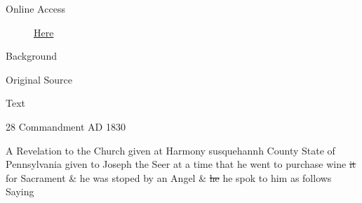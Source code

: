 			\begin{description}
				\item[Online Access] \href{https://www.josephsmithpapers.org/paper-summary/revelation-circa-august-1830-dc-27/1}{Here}
			\end{description}
			
			\begin{description}
				\item[Background]
			\end{description}
			
			
			\begin{description}
				\item[Original Source]
			\end{description}
			
			
			\begin{description}
				\item[Text]
			\end{description}
			
				\begin{center}
				28 Commandment AD 1830
				\end{center}
				
				A Revelation to the Church given at Harmony susquehannh County State of Pennsylvania given to Joseph the Seer at a time that he went to purchase wine \sout{it} for Sacrament \& he was stoped by an Angel \& \sout{he} he spok to him as follows Saying
				
